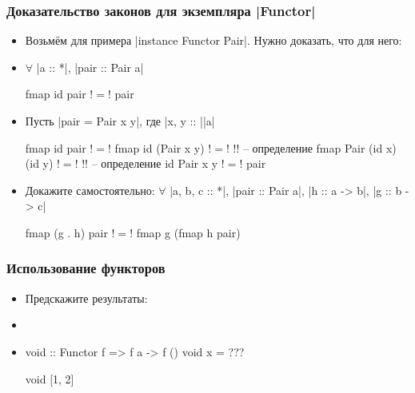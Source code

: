 \documentclass[11pt]{beamer}
\begin{document}
\begin{frame}[fragile]
  \frametitle{Доказательство законов для экземпляра \haskinline|Functor|}
  \begin{itemize}
    \item Возьмём для примера \haskinline|instance Functor Pair|. Нужно доказать, что для него:
    \item $\forall$ \haskinline|a :: *|, \haskinline|pair :: Pair a|
          \begin{haskell}
            fmap id pair !$=$! pair
          \end{haskell}
          \pause
    \item Пусть \haskinline|pair = Pair x y|, где \haskinline|x, y :: |\pause\haskinline|a|
          \begin{haskell}
            fmap id pair !$=$!
            fmap id (Pair x y) !$=$! !\pause! -- определение fmap \pause
            Pair (id x) (id y) !$=$! !\pause! -- определение id \pause
            Pair x y !$=$!
            pair
          \end{haskell}
          \pause
    \item Докажите самостоятельно: $\forall$ \haskinline|a, b, c :: *|, \haskinline|pair :: Pair a|, \haskinline|h :: a -> b|, \haskinline|g :: b -> c|
          \begin{haskell}
            fmap (g . h) pair !$=$! fmap g (fmap h pair)
          \end{haskell}
  \end{itemize}
\end{frame}

\begin{frame}[fragile]
  \frametitle{Использование функторов}
  \begin{itemize}
    \item Предскажите результаты:
          \pause
    \item[]
    \item
          \begin{haskell}
            void :: Functor f => f a -> f ()
            void x = ???

            void [1, 2]
          \end{haskell}
  \end{itemize}
\end{frame}
\end{document}
